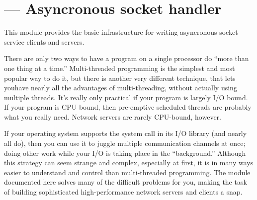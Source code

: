 \section{ ---
         Asyncronous socket handler}


This module provides the basic infrastructure for writing asyncronous 
socket service clients and servers.


There are only two ways to have a program on a single processor do 
``more than one thing at a time.'' Multi-threaded programming is the 
simplest and most popular way to do it, but there is another very 
different technique, that lets youhave nearly all the advantages of 
multi-threading, without actually using multiple threads.  It's really 
only practical if your program is largely I/O bound.  If your program 
is CPU bound, then pre-emptive scheduled threads are probably what 
you really need. Network servers are rarely CPU-bound, however.

If your operating system supports the  system call 
in its I/O library (and nearly all do), then you can use it to juggle 
multiple communication channels at once; doing other work while your 
I/O is taking place in the ``background.''  Although this strategy can 
seem strange and complex, especially at first, it is in many ways 
easier to understand and control than multi-threaded programming.  
The module documented here solves many of the difficult problems for 
you, making the task of building sophisticated high-performance 
network servers and clients a snap.

